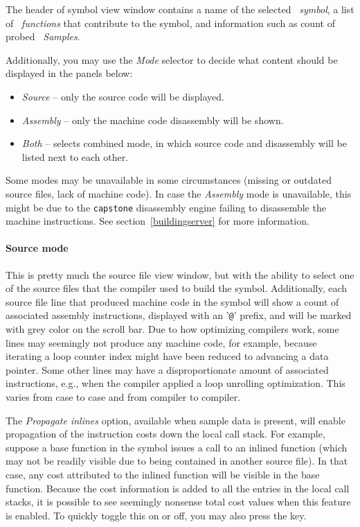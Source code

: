 \documentclass[hidelinks,titlepage,a4paper]{article}
\begin{document}
The header of symbol view window contains a name of the selected \emph{\faPuzzlePiece{}~symbol}, a list of \emph{\faSitemap{}~functions} that contribute to the symbol, and information such as count of probed \emph{\faEyeDropper{}~Samples}.

Additionally, you may use the \emph{Mode} selector to decide what content should be displayed in the panels below:

\begin{itemize}
\item \emph{Source} -- only the source code will be displayed.
\item \emph{Assembly} -- only the machine code disassembly will be shown.
\item \emph{Both} -- selects combined mode, in which source code and disassembly will be listed next to each other.
\end{itemize}

Some modes may be unavailable in some circumstances (missing or outdated source files, lack of machine code). In case the \emph{Assembly} mode is unavailable, this might be due to the \texttt{capstone} disassembly engine failing to disassemble the machine instructions. See section~\ref{buildingserver} for more information.

\paragraph{Source mode}

This is pretty much the source file view window, but with the ability to select one of the source files that the compiler used to build the symbol. Additionally, each source file line that produced machine code in the symbol will show a count of associated assembly instructions, displayed with an '\texttt{@}' prefix, and will be marked with grey color on the scroll bar. Due to how optimizing compilers work, some lines may seemingly not produce any machine code, for example, because iterating a loop counter index might have been reduced to advancing a data pointer. Some other lines may have a disproportionate amount of associated instructions, e.g., when the compiler applied a loop unrolling optimization. This varies from case to case and from compiler to compiler.

The \emph{Propagate inlines} option, available when sample data is present, will enable propagation of the instruction costs down the local call stack. For example, suppose a base function in the symbol issues a call to an inlined function (which may not be readily visible due to being contained in another source file). In that case, any cost attributed to the inlined function will be visible in the base function. Because the cost information is added to all the entries in the local call stacks, it is possible to see seemingly nonsense total cost values when this feature is enabled. To quickly toggle this on or off, you may also press the  key.
\end{document}
